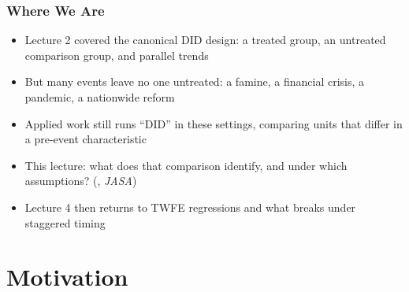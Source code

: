 \documentclass[xcolor=svgnames,9pt,english, aspectratio=169]{beamer}
\begin{document}
\begin{frame}
  \frametitle{Where We Are}
\begin{itemize}[<+->]\itemsep1em
\item Lecture 2 covered the canonical DID design: a treated group, an untreated comparison group, and parallel trends
\item But many events leave \alert{no one untreated}: a famine, a financial crisis, a pandemic, a nationwide reform
\item Applied work still runs ``DID'' in these settings, comparing units that differ in a \alert{pre-event characteristic}
\item This lecture: what does that comparison identify, and under which assumptions? (\cite{xu2026factorial}, \emph{JASA})
\item Lecture 4 then returns to TWFE regressions and what breaks under staggered timing
\end{itemize}
\end{frame}

\section{Motivation}
\end{document}
